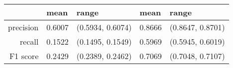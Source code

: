 \begin{table}[ht]
\centering
\begin{tabular}{rllll}
  \hline
 & mean & range & mean & range \\ 
  \hline
precision & 0.6007 & (0.5934, 0.6074) & 0.8666 & (0.8647, 0.8701) \\ 
  recall & 0.1522 & (0.1495, 0.1549) & 0.5969 & (0.5945, 0.6019) \\ 
  F1 score & 0.2429 & (0.2389, 0.2462) & 0.7069 & (0.7048, 0.7107) \\ 
   \hline
\end{tabular}
\end{table}
